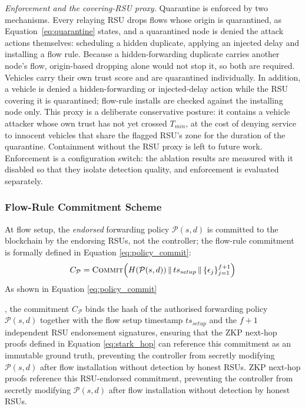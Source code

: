 \documentclass[12pt, a4paper]{report}
\begin{document}
{\textit{Enforcement and the covering-\ac{RSU} proxy.} Quarantine is
enforced by two mechanisms. Every relaying \ac{RSU} drops flows whose
origin is quarantined, as Equation~\eqref{eq:quarantine} states, and a
quarantined node is denied the attack actions themselves: scheduling a
hidden duplicate, applying an injected delay and installing a flow
rule. Because a hidden-forwarding duplicate carries another node's
flow, origin-based dropping alone would not stop it, so both are
required. Vehicles carry their own trust score and are quarantined
individually. In addition, a vehicle is denied a hidden-forwarding or
injected-delay action while the \ac{RSU} covering it is quarantined;
flow-rule installs are checked against the installing node only.
This proxy is a deliberate conservative posture: it contains a vehicle
attacker whose own trust has not yet crossed $T_{min}$, at the cost of
denying service to innocent vehicles that share the flagged \ac{RSU}'s
zone for the duration of the quarantine. Containment without the
\ac{RSU} proxy is left to future work. Enforcement is a configuration
switch: the ablation results are measured with it disabled so that
they isolate detection quality, and enforcement is evaluated
separately.

\subsubsection{Flow-Rule Commitment Scheme}
At flow setup, the \emph{endorsed} forwarding policy
$\mathcal{P}(s,d)$ is committed to the blockchain by the endorsing
RSUs, not the controller;
the flow-rule commitment is formally defined in
Equation \eqref{eq:policy_commit}:
\begin{equation}
C_{\mathcal{P}} = \textsc{Commit}\!\left(
H(\mathcal{P}(s,d)) \,\|\, ts_{setup} \,\|\,
\{\epsilon_j\}_{j=1}^{f+1}\right)
\label{eq:policy_commit}
\end{equation}
As shown in Equation \eqref{eq:policy_commit}{, the commitment
$C_{\mathcal{P}}$ binds the hash of the authorised forwarding policy
$\mathcal{P}(s,d)$ together with the flow setup timestamp
$ts_{setup}$ and the $f+1$ independent RSU endorsement signatures,
ensuring that the ZKP next-hop proofs defined in
Equation \eqref{eq:stark_hop}{ can reference this commitment as an
immutable ground truth, preventing the controller from secretly
modifying $\mathcal{P}(s,d)$ after flow installation without
detection by honest RSUs.}
ZKP next-hop proofs reference this RSU-endorsed commitment,
preventing the controller from secretly modifying $\mathcal{P}(s,d)$
after flow installation without detection by honest RSUs.

}}
\end{document}
